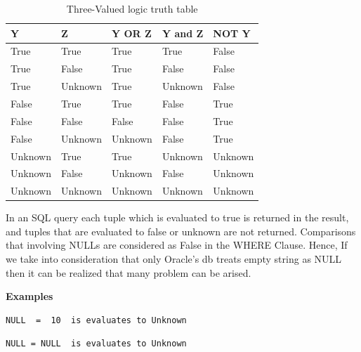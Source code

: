 \begin{table}[h]
\centering
\caption{Three-Valued logic truth table}
\label{my-label}
\begin{tabular}{|l|l|l|l|l| }
\hline
\textbf{Y} & \textbf{Z} & \textbf{Y OR Z} & \textbf{Y and Z} & \textbf{NOT Y} \\ \hline
True       & True       & True            & True             & False          \\ \hline
True       & False      & True            & False            & False          \\ \hline
True       & Unknown    & True            & Unknown          & False          \\ \hline
False      & True       & True            & False            & True           \\ \hline
False      & False      & False           & False            & True           \\ \hline
False      & Unknown    & Unknown         & False            & True           \\ \hline
Unknown    & True       & True            & Unknown          & Unknown        \\ \hline
Unknown    & False      & Unknown         & False            & Unknown        \\ \hline
Unknown    & Unknown    & Unknown         & Unknown          & Unknown        \\ \hline
\end{tabular}
\end{table}

\hfill\newpage
In an SQL query each tuple which is evaluated to true is returned in the result, and tuples that are evaluated to false or unknown are not returned. Comparisons that involving NULLs are considered as False in the WHERE Clause. Hence, If we take into consideration that only Oracle’s db treats empty string as NULL then it can be realized that many problem can be arised. 

\hfill\newline
\textbf{Examples}
\begin{mdframed}[nobreak=true, backgroundcolor=lightgray!20] 
\begin{lstlisting}[style=SQL]
NULL  =  10  is evaluates to Unknown 
\end{lstlisting}
\end{mdframed}

\begin{mdframed}[nobreak=true, backgroundcolor=lightgray!20] 
\begin{lstlisting}[style=SQL]
NULL = NULL  is evaluates to Unknown 
\end{lstlisting}
\end{mdframed}

